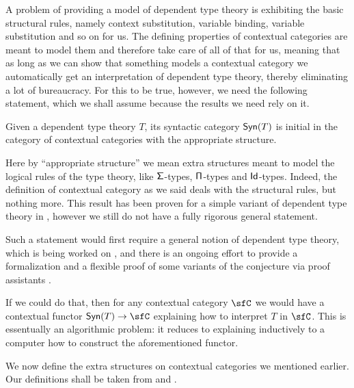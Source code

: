 A problem of providing a model of dependent type theory is exhibiting the
basic structural rules, namely context substitution, variable binding,
variable substitution and so on for us. The defining properties of contextual
categories are meant to model them and therefore 
take care of all of that for us, meaning that as long
as we can show that something models a contextual category we automatically get
an interpretation of dependent type theory, thereby eliminating a lot of
bureaucracy. For this to be true, however, we need the following statement,
which we shall assume because the results we need rely on it.

\begin{named}[Initiality]
  Given a dependent type theory $T$, its syntactic category $\operatorname{\mathsf{Syn}}(T)$ is initial
  in the category of contextual categories with the appropriate structure.
\end{named}

Here by ``appropriate structure'' we mean extra structures meant to model the
logical rules of the type theory, like $\operatorname{\mathsf{\Sigma}}$-types, $\operatorname{\mathsf{\Pi}}$-types and
$\operatorname{\mathsf{Id}}$-types. Indeed, the definition of contextual category as we said deals with
the structural rules, but nothing more.
This result has been proven for a simple variant of dependent type theory in
\cite{Str91}, however we still do not have a fully rigorous general statement.

Such a statement would first require a general notion of dependent type
theory, which is being worked on \cite{BHL20}, and
there is an ongoing effort to provide a formalization and a flexible proof of
some variants of the conjecture via proof assistants \cite{BL20}.

If we could do that, then for any contextual category $\sfC$ we would have a
contextual functor $\Syn(T)\rightarrow\sfC$ explaining how to interpret $T$ in
$\sfC$. This is essentually an algorithmic problem: it reduces to explaining
inductively to a computer how to construct the aforementioned functor.

We now define the extra structures on contextual categories we mentioned
earlier. Our definitions shall be taken from \cite{KL12} and \cite{KL18}.

